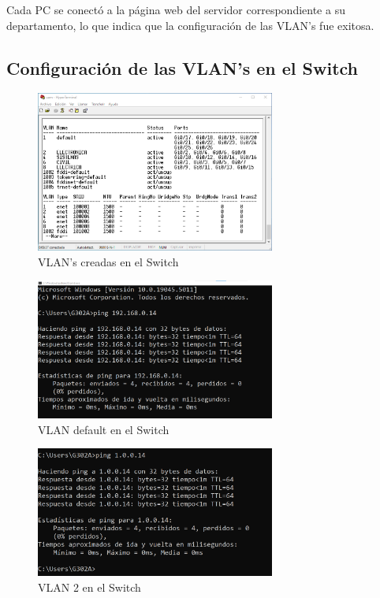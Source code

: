         Cada PC se conectó a la página web del servidor correspondiente a su departamento, lo que indica que la configuración de las VLAN's fue exitosa.



    \subsection{Configuración de las VLAN's en el Switch}
        


        \begin{figure}[H]
            \centering
            \includegraphics[width=0.7\textwidth]{img/vlansSwitch.png}
            \caption{VLAN's creadas en el Switch}
            \label{fig:vlansSwitch}
        \end{figure}

        \begin{figure}[H]
            \centering
            \includegraphics[width=0.7\textwidth]{img/ping_default.png}
            \caption{VLAN default en el Switch}
            \label{fig:ping_default}
        \end{figure}


        \begin{figure}[H]
            \centering
            \includegraphics[width=0.7\textwidth]{img/ping_vlan2.png}
            \caption{VLAN 2 en el Switch}
            \label{fig:ping_vl an2}
        \end{figure}


